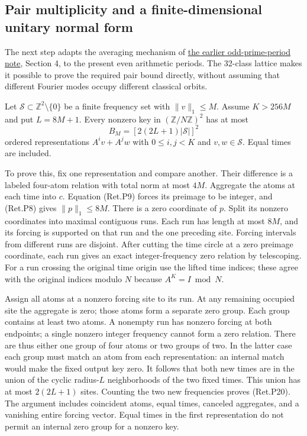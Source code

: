 \hypertarget{pair-multiplicity-and-a-finite-dimensional-unitary-normal-form}{%
\subsection{Pair multiplicity and a finite-dimensional unitary normal form}\label{pair-multiplicity-and-a-finite-dimensional-unitary-normal-form}}

The next step adapts the averaging mechanism of
\href{https://github.com/ChurilovMaksim/BGS/blob/main/mathematics/pell/pell_smooth_resonance.md}{the earlier odd-prime-period note}, Section 4,
to the present even arithmetic periods. The 32-class lattice makes it
possible to prove the required pair bound directly, without assuming
that different Fourier modes occupy different classical orbits.

Let \(\mathcal S\subset\mathbb Z^2\setminus\{0\}\) be a finite frequency set
with \(\|v\|_1\le M\). Assume \(K>256M\) and put \(L=8M+1\).
Every nonzero key in \((\mathbb Z/N\mathbb Z)^2\) has at most
\[
 B_M=\left[2(2L+1)|\mathcal S|\right]^2                     \tag{Ret.P20}
\]
ordered representations \(A^iv+A^jw\) with \(0\le i,j<K\) and
\(v,w\in\mathcal S\). Equal times are included.

To prove this, fix one representation and compare another. Their difference
is a labeled four-atom relation with total norm at most \(4M\). Aggregate
the atoms at each time into \(c\). Equation (Ret.P9) forces its preimage to be
integer, and (Ret.P8) gives \(\|p\|_1\le8M\). There is a zero coordinate of \(p\).
Split its nonzero coordinates into maximal contiguous runs. Each run
has length at most \(8M\), and its forcing is supported on that run and
the one preceding site. Forcing intervals from different runs are disjoint.
After cutting the time circle at a zero preimage coordinate, each run
gives an exact integer-frequency zero relation by telescoping.
For a run crossing the original time origin use the lifted time indices;
these agree with the original indices modulo \(N\) because \(A^K=I\bmod N\).

Assign all atoms at a nonzero forcing site to its run. At any remaining
occupied site the aggregate is zero; those atoms form a separate zero
group. Each group contains at least two atoms. A nonempty run has
nonzero forcing at both endpoints; a single nonzero integer frequency
cannot form a zero relation.
There are thus either one group of four atoms or two groups of two.
In the latter case each group must match an atom from each representation:
an internal match would make the fixed output key zero.
It follows that both new times are in the union of the cyclic
radius-\(L\) neighborhoods of the two fixed times. This union has at most
\(2(2L+1)\) sites. Counting the two new frequencies proves (Ret.P20).
The argument includes coincident atoms, equal times, canceled aggregates,
and a vanishing entire forcing vector. Equal times in the first
representation do not permit an internal zero group for a nonzero key.


